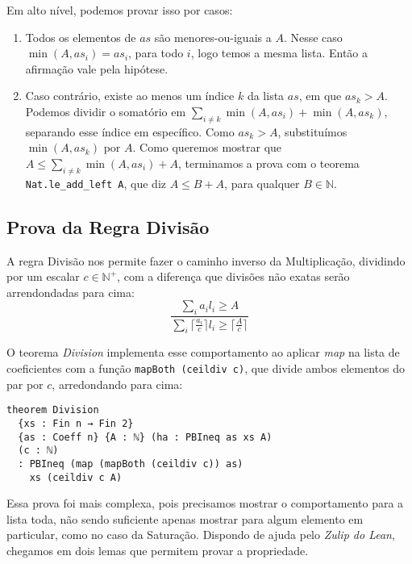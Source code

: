 \documentclass[conference]{IEEEtran}
\begin{document}
Em alto nível, podemos provar isso por casos:
\begin{enumerate}
    \item Todos os elementos de $as$ são menores-ou-iguais a $A$.
          Nesse caso $\min(A,as_i) = as_i$, para todo $i$, logo temos a mesma lista.
          Então a afirmação vale pela hipótese.
    \item Caso contrário, existe ao menos um índice $k$ da lista $as$, em que $as_k > A$.
          Podemos dividir o somatório em $\sum_{i\neq k}{\min(A,as_i) + \min(A,as_k)}$, separando esse índice em específico.
          Como $as_k > A$, substituímos $\min(A,as_k)$ por $A$.
          Como queremos mostrar que $A \le \sum_{i\neq k}{\min(A,as_i) + A}$,
          terminamos a prova com o teorema \texttt{Nat.le\_add\_left A}, que diz
          $A \le B + A$, para qualquer $B \in \mathbb{N}$.

\end{enumerate}


\subsection{Prova da Regra Divisão}
A regra Divisão nos permite fazer o caminho inverso da Multiplicação, dividindo por um escalar $c \in \mathbb{N}^+$, com a diferença que divisões não exatas serão arrendondadas
para cima:
\begin{equation}
    \frac
    {\sum_i{a_i l_i} \ge A}
    {\sum_i{ \lceil \frac{a_i}{c} \rceil l_i} \ge \lceil \frac{A}{c} \rceil}
\end{equation}

O teorema \textit{Division} implementa esse comportamento ao aplicar \textit{map} na lista de coeficientes com a função
\texttt{mapBoth (ceildiv c)}, que divide ambos elementos do par por $c$, arredondando para cima:
\begin{verbatim}
theorem Division
  {xs : Fin n → Fin 2}
  {as : Coeff n} {A : ℕ} (ha : PBIneq as xs A)
  (c : ℕ)
  : PBIneq (map (mapBoth (ceildiv c)) as)
    xs (ceildiv c A)
\end{verbatim}

Essa prova foi mais complexa, pois precisamos mostrar o comportamento para a lista toda,
não sendo suficiente apenas mostrar para algum elemento em particular, como no caso da Saturação.
Dispondo de ajuda pelo \textit{Zulip do Lean}, chegamos em dois lemas que permitem provar a propriedade.
\end{document}
